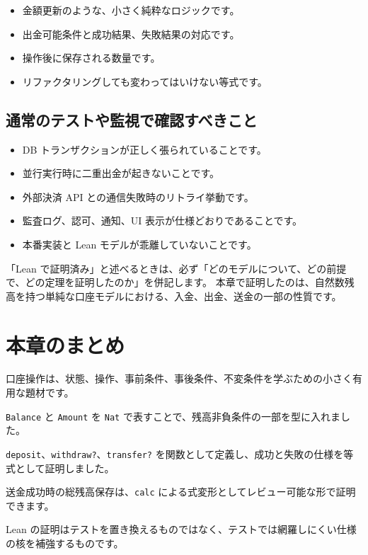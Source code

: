 \begin{itemize}
\item 金額更新のような、小さく純粋なロジックです。
\item 出金可能条件と成功結果、失敗結果の対応です。
\item 操作後に保存される数量です。
\item リファクタリングしても変わってはいけない等式です。
\end{itemize}

\subsection{通常のテストや監視で確認すべきこと}

\begin{itemize}
\item DB トランザクションが正しく張られていることです。
\item 並行実行時に二重出金が起きないことです。
\item 外部決済 API との通信失敗時のリトライ挙動です。
\item 監査ログ、認可、通知、UI 表示が仕様どおりであることです。
\item 本番実装と Lean モデルが乖離していないことです。
\end{itemize}

「Lean で証明済み」と述べるときは、必ず「どのモデルについて、どの前提で、どの定理を証明したのか」を併記します。
本章で証明したのは、自然数残高を持つ単純な口座モデルにおける、入金、出金、送金の一部の性質です。

\section{本章のまとめ}

口座操作は、状態、操作、事前条件、事後条件、不変条件を学ぶための小さく有用な題材です。

\texttt{Balance} と \texttt{Amount} を \texttt{Nat} で表すことで、残高非負条件の一部を型に入れました。

\texttt{deposit}、\texttt{withdraw?}、\texttt{transfer?} を関数として定義し、成功と失敗の仕様を等式として証明しました。

送金成功時の総残高保存は、\texttt{calc} による式変形としてレビュー可能な形で証明できます。

Lean の証明はテストを置き換えるものではなく、テストでは網羅しにくい仕様の核を補強するものです。
